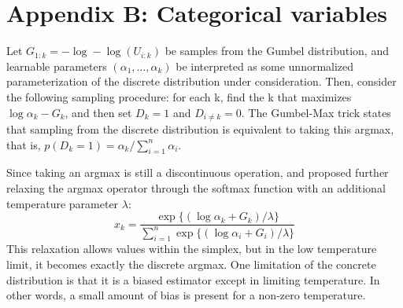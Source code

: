 \documentclass{article}
\begin{document}





\section{Appendix B: Categorical variables}

Let $G_{1:k} = -\log-\log(U_{i:k})$ be samples from the Gumbel distribution, and learnable parameters $(\alpha_1, \dots, \alpha_k)$ be interpreted as some unnormalized parameterization of the discrete distribution under consideration.
Then, consider the following sampling procedure: for each k, find the k that maximizes $\log \alpha_k - G_k$, and then set $D_k=1$ and $D_{i \neq k} = 0$. The Gumbel-Max trick states that sampling from the discrete distribution is equivalent to taking this argmax, that is, $p(D_k = 1) = \alpha_k / \sum_{i=1}^n \alpha_i$.

Since taking an argmax is still a discontinuous operation, \cite{maddison2016concrete} and \cite{jang2016categorical} proposed further relaxing the argmax operator through the softmax function with an additional temperature parameter $\lambda$:
\begin{equation}
x_k = \frac{\exp\{( \log \alpha_k+ G_k) / \lambda\}}{\sum_{i=1}^n\exp\{( \log \alpha_i+ G_i) / \lambda\}}
\end{equation}
This relaxation allows values within the simplex, but in the low temperature limit, it becomes exactly the discrete argmax.
One limitation of the concrete distribution is that it is a biased estimator except in limiting temperature.
In other words, a small amount of bias is present for a non-zero temperature.
\end{document}

